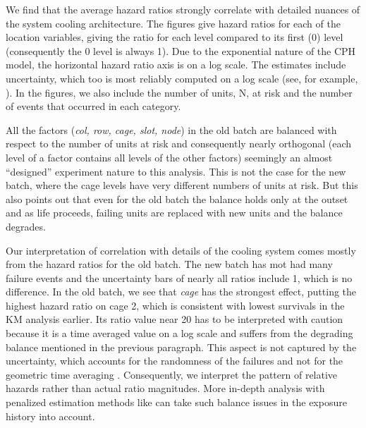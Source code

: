 We find that the average hazard ratios strongly correlate with
detailed nuances of the system cooling architecture.  The figures give
hazard ratios for each of the location variables, giving the ratio for
each level compared to its first (0) level (consequently the 0 level
is always 1). Due to the exponential nature of the CPH model, the
horizontal hazard ratio axis is on a log scale. The estimates include
uncertainty, which too is most reliably computed on a log scale (see,
for example, \cite{Ostrouchov88}). In the figures, we also include the
number of units, N, at risk and the number of events that occurred in
each category.

All the factors ({\em col, row, cage, slot, node}) in the old batch
are balanced with respect to the number of units at risk and
consequently nearly orthogonal (each level of a factor contains all
levels of the other factors) seemingly an almost ``designed''
experiment nature to this analysis. This is not the case for the new
batch, where the cage levels have very different numbers of units at
risk. But this also points out that even for the old batch the balance
holds only at the outset and as life proceeds, failing units are
replaced with new units and the balance degrades.

Our interpretation of correlation with details of the cooling system
comes mostly from the hazard ratios for the old batch. The new batch
has mot had many failure events and the uncertainty bars of nearly all
ratios include 1, which is no difference. In the old batch, we see
that {\em cage} has the strongest effect, putting the highest hazard
ratio on cage 2, which is consistent with lowest survivals in the KM
analysis earlier. Its ratio value near 20 has to be interpreted with
caution because it is a time averaged value on a log scale and suffers
from the degrading balance mentioned in the previous paragraph. This
aspect is not captured by the uncertainty, which accounts for the
randomness of the failures and not for the geometric time averaging
\cite{coxhazardinterpret}. Consequently, we interpret the pattern of
relative hazards rather than actual ratio magnitudes. More in-depth
analysis with penalized estimation methods like \cite{bender2019} can
take such balance issues in the exposure history into account.
